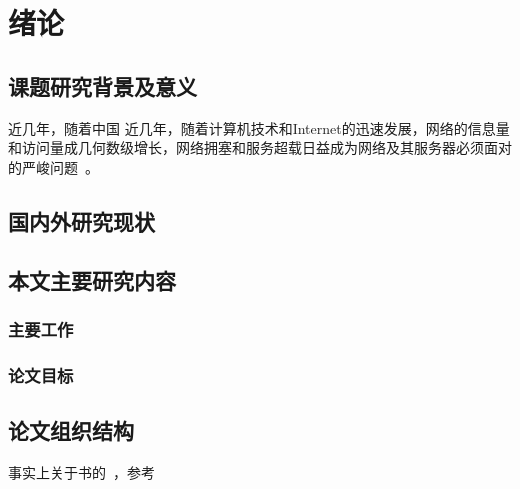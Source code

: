 \chapter{绪论}
\label{cha:introduction}
\section{课题研究背景及意义}
近几年，随着中国
近几年，随着计算机技术和Internet的迅速发展，网络的信息量和访问量成几何数级增长，网络拥塞和服务超载日益成为网络及其服务器必须面对的严峻问题~\cite{王霜2004web}。
\section{国内外研究现状}
\section{本文主要研究内容}
\subsection{主要工作}
\subsection{论文目标}
\section{论文组织结构}
事实上关于书的~\cite{curtis2016aspectj}，参考~\cite{杨宝林2015基于}